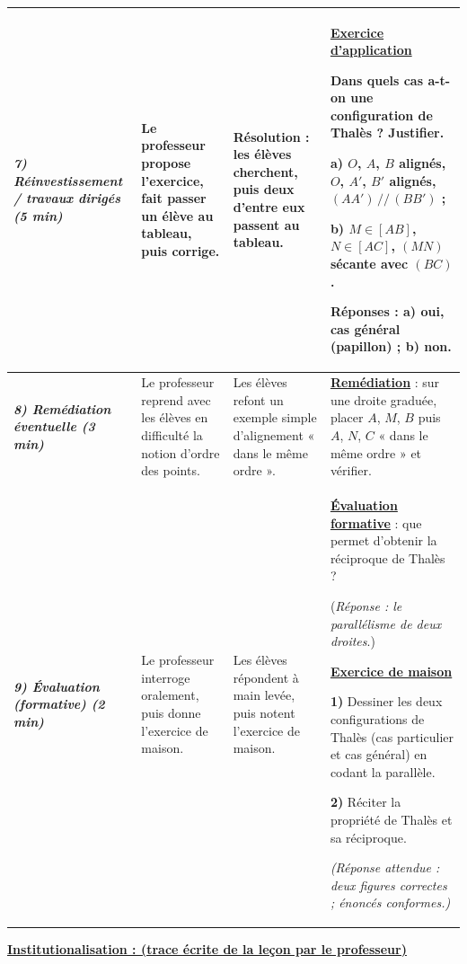 \documentclass[10pt]{article}
\newcommand{\titreR}[1]{\underline{\textcolor{rougetitre}{\bfseries #1}}}
\newcommand{\app}{\titreR{Exercice d'application}}
\newcommand{\maison}{\underline{\textcolor{rougemaison}{\bfseries Exercice de maison}}}
\newcommand{\moment}[1]{\textbf{\itshape #1}}
\begin{document}
\begin{longtable}{|p{2.35cm}|p{5.35cm}|p{4.55cm}|p{13.85cm}|}
\moment{7) Réinvestissement / travaux dirigés (5 min)} &
Le professeur propose l'exercice, fait passer un élève au tableau, puis corrige. &
\textbf{Résolution} : les élèves cherchent, puis deux d'entre eux passent au tableau. &
\app \par
Dans quels cas a-t-on une configuration de Thalès ? Justifier. \par
a) $O$, $A$, $B$ alignés, $O$, $A'$, $B'$ alignés, $(AA')\,//\,(BB')$ ; \par
b) $M\in[AB]$, $N\in[AC]$, $(MN)$ sécante avec $(BC)$. \par
\textbf{Réponses :} a) oui, cas général (papillon) ; b) non. \\ \hline

\moment{8) Remédiation éventuelle (3 min)} &
Le professeur reprend avec les élèves en difficulté  la notion d'ordre des points. &
Les élèves refont  un exemple simple d'alignement « dans le même ordre ». &
\titreR{Remédiation} : sur une droite graduée, placer $A$, $M$, $B$ puis $A$, $N$,
$C$ « dans le même ordre » et vérifier. \\ \hline

\moment{9) Évaluation (formative) (2 min)} &
Le professeur interroge oralement, puis donne l'exercice de maison. &
Les élèves répondent à main levée, puis notent l'exercice de maison. &
\titreR{Évaluation formative} : que permet d'obtenir la réciproque de Thalès ? \par
(\textit{Réponse : le parallélisme de deux droites}.) \par
\maison \par
\textbf{1)} Dessiner les deux configurations de Thalès (cas particulier et cas
général) en codant la parallèle. \par
\textbf{2)} Réciter la propriété de Thalès et sa réciproque. \par
\textit{(Réponse attendue : deux figures correctes ; énoncés conformes.)} \\ \hline
\end{longtable}

\begin{center}
\underline{\textcolor{rougetitre}{\large\bfseries Institutionalisation \; : \; (trace écrite de la leçon par le professeur)}}
\end{center}
\end{document}
